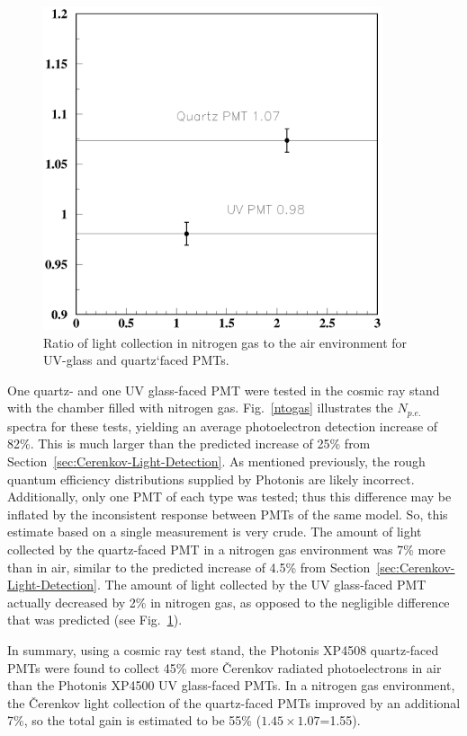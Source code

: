 \begin{figure}
\hspace{0.5cm}
\begin{centering}
\includegraphics[height=9.5cm]{PMT-studies/gas.eps}
\vspace{0.5cm}
\caption{\small{Ratio of light collection in nitrogen gas to the air 
environment for UV-glass and quartz`faced PMTs.}}
\label{gas}
\end{centering}
\end{figure}

One quartz- and one UV glass-faced PMT were tested in the cosmic ray
stand with the chamber filled with nitrogen gas.  Fig.~\ref{ntogas}
illustrates the $N_{p.e.}$ spectra for these tests, yielding an average
photoelectron detection increase of 82\%.  This is much larger than
the predicted increase of 25\% from Section~\ref{sec:Cerenkov-Light-Detection}.
As mentioned previously, the rough quantum efficiency distributions
supplied by Photonis are likely incorrect.  Additionally, only one PMT 
of each type was tested; thus this difference may be inflated by the 
inconsistent response between PMTs of the same model.  So, this estimate 
based on a single measurement is very crude.  The amount of light collected 
by the quartz-faced PMT in a nitrogen gas environment was 7\% more than in 
air, similar to the predicted increase of 4.5\% from
Section~\ref{sec:Cerenkov-Light-Detection}.  The amount of light collected 
by the UV glass-faced PMT actually decreased by 2\% in nitrogen gas, as 
opposed to the negligible difference that was predicted (see Fig.~\ref{gas}). 

In summary, using a cosmic ray test stand, the Photonis XP4508 quartz-faced 
PMTs were found to collect 45\% more {\v C}erenkov radiated photoelectrons
in air than the Photonis XP4500 UV glass-faced PMTs.  In a nitrogen gas 
environment, the {\v C}erenkov light collection of the quartz-faced
PMTs improved by an additional 7\%, so the total gain is estimated  
to be 55\% ($1.45\times1.07$=1.55). 
